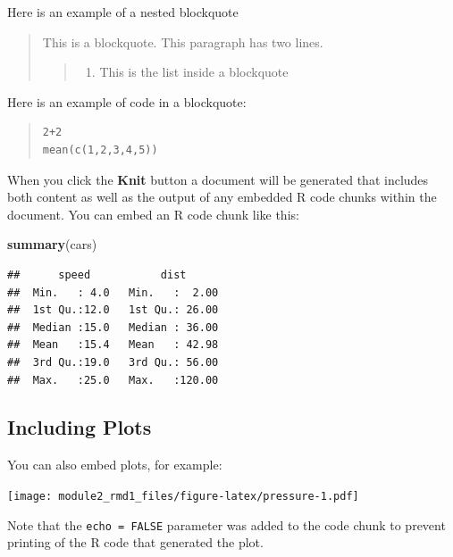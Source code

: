 \documentclass[]{article}
\newenvironment{Shaded}{\begin{snugshade}}{\end{snugshade}}
\newcommand{\KeywordTok}[1]{\textcolor[rgb]{0.13,0.29,0.53}{\textbf{#1}}}
\newcommand{\NormalTok}[1]{#1}
\providecommand{\tightlist}{%
  \setlength{\itemsep}{0pt}\setlength{\parskip}{0pt}}
\begin{document}
Here is an example of a nested blockquote

\begin{quote}
This is a blockquote. This paragraph has two lines.

\begin{quote}
\begin{enumerate}
\def\labelenumi{\arabic{enumi}.}
\tightlist
\item
  This is the list inside a blockquote
\end{enumerate}
\end{quote}
\end{quote}

Here is an example of code in a blockquote:

\begin{quote}
\begin{verbatim}
2+2
mean(c(1,2,3,4,5))
\end{verbatim}
\end{quote}

When you click the \textbf{Knit} button a document will be generated
that includes both content as well as the output of any embedded R code
chunks within the document. You can embed an R code chunk like this:

\begin{Shaded}
\begin{Highlighting}[]
\KeywordTok{summary}\NormalTok{(cars)}
\end{Highlighting}
\end{Shaded}

\begin{verbatim}
##      speed           dist       
##  Min.   : 4.0   Min.   :  2.00  
##  1st Qu.:12.0   1st Qu.: 26.00  
##  Median :15.0   Median : 36.00  
##  Mean   :15.4   Mean   : 42.98  
##  3rd Qu.:19.0   3rd Qu.: 56.00  
##  Max.   :25.0   Max.   :120.00
\end{verbatim}

\subsection{Including Plots}\label{including-plots}

You can also embed plots, for example:

\texttt{[image: module2\_rmd1\_files/figure-latex/pressure-1.pdf]}

Note that the \texttt{echo\ =\ FALSE} parameter was added to the code
chunk to prevent printing of the R code that generated the plot.
\end{document}
